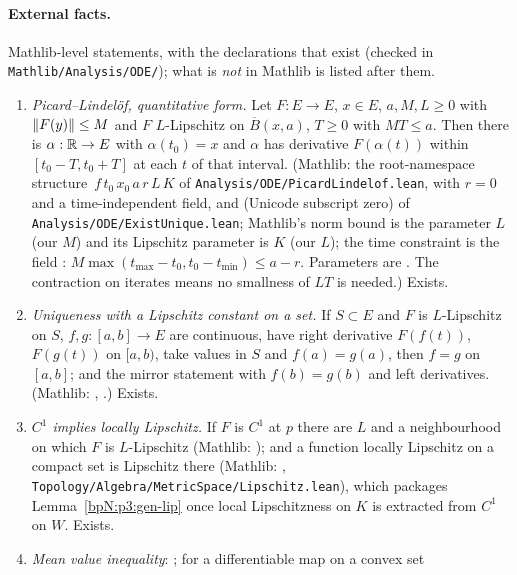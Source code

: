 \paragraph{External facts.} Mathlib-level statements, with the declarations that exist (checked in
\texttt{Mathlib/Analysis/ODE/}); what is \emph{not} in Mathlib is listed after them.
{\raggedright
\begin{enumerate}[label=(E\arabic*),leftmargin=2.2em]
\item\label{bpN:p3:ext-pl} \emph{Picard--Lindel\"of, quantitative form.} Let $F:E\to E$, $x\in E$, $a,M,L\ge0$ with
  $\lVert F(y)\rVert\le M$ and $F$ $L$-Lipschitz on $\overline B(x,a)$, $T\ge0$ with $MT\le a$. Then there is $\alpha:\mathbb{R}\to E$
  with $\alpha(t_0)=x$ and $\alpha$ has derivative $F(\alpha(t))$ within $[t_0-T,t_0+T]$ at each $t$ of that interval.
  (Mathlib: the root-namespace structure \,$f\,t_0\,x_0\,a\,r\,L\,K$ of
  \texttt{Analysis/ODE/PicardLindelof.lean}, with $r=0$ and a time-independent field, and
   (Unicode subscript zero) of \texttt{Analysis/ODE/ExistUnique.lean};
  Mathlib's norm bound is the parameter $L$ (our $M$) and its Lipschitz parameter is $K$ (our $L$); the time constraint is the field
  : $M\max(t_{\max}-t_0,t_0-t_{\min})\le a-r$. Parameters are . The contraction on iterates means no smallness of
  $LT$ is needed.) Exists.
\item\label{bpN:p3:ext-unique} \emph{Uniqueness with a Lipschitz constant on a set.} If $S\subset E$ and $F$ is
  $L$-Lipschitz on $S$, $f,g:[a,b]\to E$ are continuous, have right derivative $F(f(t))$, $F(g(t))$ on $[a,b)$, take
  values in $S$ and $f(a)=g(a)$, then $f=g$ on $[a,b]$; and the mirror statement with $f(b)=g(b)$ and left
  derivatives. (Mathlib: , .)
  Exists.
\item\label{bpN:p3:ext-lip-local} \emph{$C^1$ implies locally Lipschitz.} If $F$ is $C^1$ at $p$ there are $L$ and a
  neighbourhood on which $F$ is $L$-Lipschitz (Mathlib: ); and a function locally Lipschitz on a compact set is Lipschitz there
  (Mathlib: , \texttt{Topology/Algebra/MetricSpace/Lipschitz.lean}),
  which packages Lemma~\ref{bpN:p3:gen-lip} once local Lipschitzness on $K$ is extracted from $C^1$ on $W$. Exists.
\item\label{bpN:p3:ext-mvt} \emph{Mean value inequality}: ; for a differentiable map on a convex set

\end{enumerate}}
